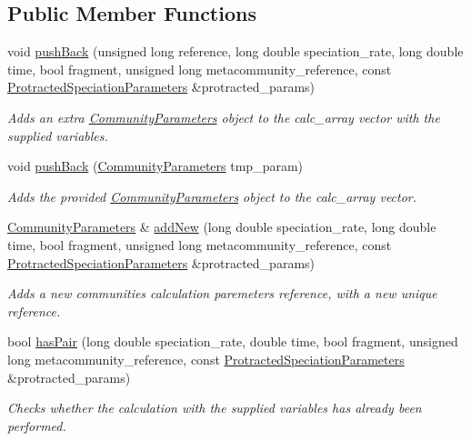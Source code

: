 \subsection*{Public Member Functions}
\begin{DoxyCompactItemize}
\item 
void \hyperlink{struct_communities_array_a03dac0fa7caadfbcd54bff684d3e72fe}{push\+Back} (unsigned long reference, long double speciation\+\_\+rate, long double time, bool fragment, unsigned long metacommunity\+\_\+reference, const \hyperlink{struct_protracted_speciation_parameters}{Protracted\+Speciation\+Parameters} \&protracted\+\_\+params)
\begin{DoxyCompactList}\small\item\em Adds an extra \hyperlink{struct_community_parameters}{Community\+Parameters} object to the calc\+\_\+array vector with the supplied variables. \end{DoxyCompactList}\item 
void \hyperlink{struct_communities_array_a0abeec9457993dffd047a78db4e4b289}{push\+Back} (\hyperlink{struct_community_parameters}{Community\+Parameters} tmp\+\_\+param)
\begin{DoxyCompactList}\small\item\em Adds the provided \hyperlink{struct_community_parameters}{Community\+Parameters} object to the calc\+\_\+array vector. \end{DoxyCompactList}\item 
\hyperlink{struct_community_parameters}{Community\+Parameters} \& \hyperlink{struct_communities_array_ad2f4547bda62b1bfeca6d94696436989}{add\+New} (long double speciation\+\_\+rate, long double time, bool fragment, unsigned long metacommunity\+\_\+reference, const \hyperlink{struct_protracted_speciation_parameters}{Protracted\+Speciation\+Parameters} \&protracted\+\_\+params)
\begin{DoxyCompactList}\small\item\em Adds a new communities calculation paremeters reference, with a new unique reference. \end{DoxyCompactList}\item 
bool \hyperlink{struct_communities_array_a0bd0be60b599588b3855f4872b63a3de}{has\+Pair} (long double speciation\+\_\+rate, double time, bool fragment, unsigned long metacommunity\+\_\+reference, const \hyperlink{struct_protracted_speciation_parameters}{Protracted\+Speciation\+Parameters} \&protracted\+\_\+params)
\begin{DoxyCompactList}\small\item\em Checks whether the calculation with the supplied variables has already been performed. \end{DoxyCompactList}\end{DoxyCompactItemize}
